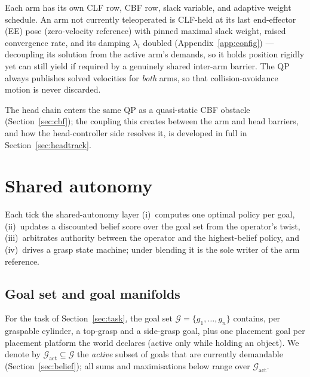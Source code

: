\documentclass[12pt,a4paper,twoside,openright]{report}
\begin{document}
Each arm has its own CLF row, CBF row, slack variable, and adaptive weight schedule. An arm not currently teleoperated is CLF-held at its last end-effector (EE) pose (zero-velocity reference) with pinned maximal slack weight, raised convergence rate, and its damping $\lambda_i$ doubled (Appendix~\ref{app:config}) --- decoupling its solution from the active arm's demands, so it holds position rigidly yet can still yield if required by a genuinely shared inter-arm barrier. The QP always publishes solved velocities for \emph{both} arms, so that collision-avoidance motion is never discarded.

The head chain enters the same QP as a quasi-static CBF obstacle (Section~\ref{sec:cbf}); the coupling this creates between the arm and head barriers, and how the head-controller side resolves it, is developed in full in Section~\ref{sec:headtrack}.

\section{Shared autonomy}
\label{sec:sa}

Each tick the shared-autonomy layer (i)~computes one optimal policy per goal, (ii)~updates a discounted belief score over the goal set from the operator's twist, (iii)~arbitrates authority between the operator and the highest-belief policy, and (iv)~drives a grasp state machine; under blending it is the sole writer of the arm reference.

\subsection{Goal set and goal manifolds}
\label{sec:policies}

For the task of Section~\ref{sec:task}, the goal set $\mathcal{G} = \{g_1,\dots,g_n\}$ contains, per graspable cylinder, a top-grasp and a side-grasp goal, plus one placement goal per placement platform the world declares (active only while holding an object). We denote by $\mathcal{G}_{\text{act}} \subseteq \mathcal{G}$ the \emph{active} subset of goals that are currently demandable (Section~\ref{sec:belief}); all sums and maximisations below range over $\mathcal{G}_{\text{act}}$.
\end{document}
